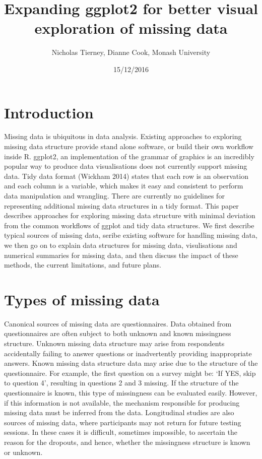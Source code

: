 \documentclass[]{article}
\title{Expanding ggplot2 for better visual exploration of missing data}
\author{Nicholas Tierney, Dianne Cook, Monash University}
\date{15/12/2016}
\begin{document}
\maketitle

\section{Introduction}\label{introduction}

Missing data is ubiquitous in data analysis. Existing approaches to
exploring missing data structure provide stand alone software, or build
their own workflow inside R. ggplot2, an implementation of the grammar
of graphics is an incredibly popular way to produce data visualisations
does not currently support missing data. Tidy data format (Wickham 2014)
states that each row is an observation and each column is a variable,
which makes it easy and consistent to perform data manipulation and
wrangling. There are currently no guidelines for representing additional
missing data structures in a tidy format. This paper describes
approaches for exploring missing data structure with minimal deviation
from the common workflows of ggplot and tidy data structures. We first
describe typical sources of missing data, seribe existing software for
handling missing data, we then go on to explain data structures for
missing data, visulisations and numerical summaries for missing data,
and then discuss the impact of these methods, the current limitations,
and future plans.

\section{Types of missing data}\label{types-of-missing-data}

Canonical sources of missing data are questionnaires. Data obtained from
questionnaires are often subject to both unknown and known missingness
structure. Unknown missing data structure may arise from respondents
accidentally failing to answer questions or inadvertently providing
inappropriate answers. Known missing data structure data may arise due
to the structure of the questionnaire. For example, the first question
on a survey might be: `If YES, skip to question 4', resulting in
questions 2 and 3 missing. If the structure of the questionnaire is
known, this type of missingness can be evaluated easily. However, if
this information is not available, the mechanism responsible for
producing missing data must be inferred from the data. Longitudinal
studies are also sources of missing data, where participants may not
return for future testing sessions. In these cases it is difficult,
sometimes impossible, to ascertain the reason for the dropouts, and
hence, whether the missingness structure is known or unknown.
\end{document}
